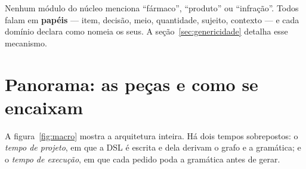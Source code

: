 \documentclass[11pt,a4paper]{article}
\begin{document}
\vspace{2mm}

Nenhum módulo do núcleo menciona ``fármaco'', ``produto'' ou ``infração''. Todos
falam em \textbf{papéis} --- item, decisão, meio, quantidade, sujeito, contexto
--- e cada domínio declara como nomeia os seus. A seção~\ref{sec:genericidade}
detalha esse mecanismo.

\section{Panorama: as peças e como se encaixam}

A figura~\ref{fig:macro} mostra a arquitetura inteira. Há dois tempos
sobrepostos: o \emph{tempo de projeto}, em que a DSL é escrita e dela derivam o
grafo e a gramática; e o \emph{tempo de execução}, em que cada pedido poda a
gramática antes de gerar.
\end{document}
